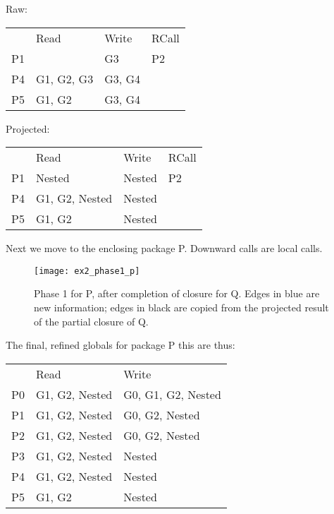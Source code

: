 \documentclass{article}
\begin{document}
\begin{center}
\begin{multicols}{2}
  Raw:\\
  \begin{tabular}{llll}
       & Read       & Write  & RCall \\
    P1 &            & G3     & P2    \\
    P4 & G1, G2, G3 & G3, G4 &       \\
    P5 & G1, G2     & G3, G4 &       \\
  \end{tabular}

  \columnbreak
  Projected:\\
  \begin{tabular}{|llll}
       & Read           & Write  & RCall \\
    P1 & Nested         & Nested & P2    \\
    P4 & G1, G2, Nested & Nested &       \\
    P5 & G1, G2         & Nested &       \\
  \end{tabular}
\end{multicols}
\end{center}

\pagebreak
\noindent
Next we move to the enclosing package P. Downward calls are local calls.

\begin{figure}[h]
  \begin{center}
    \texttt{[image: ex2\_phase1\_p]}
  \end{center}
  \caption{Phase 1 for P, after completion of closure for Q. Edges in
    {\color{RoyalBlue}blue} are new information; edges in black are copied
    from the projected result of the partial closure of Q.}
\end{figure}

\noindent
The final, refined globals for package P this are thus:

\begin{center}
  \begin{tabular}{lll}
       & Read           & Write              \\
    P0 & G1, G2, Nested & G0, G1, G2, Nested \\
    P1 & G1, G2, Nested & G0, G2, Nested     \\
    P2 & G1, G2, Nested & G0, G2, Nested     \\
    P3 & G1, G2, Nested & Nested             \\
    P4 & G1, G2, Nested & Nested             \\
    P5 & G1, G2         & Nested             \\
  \end{tabular}
\end{center}
\end{document}
